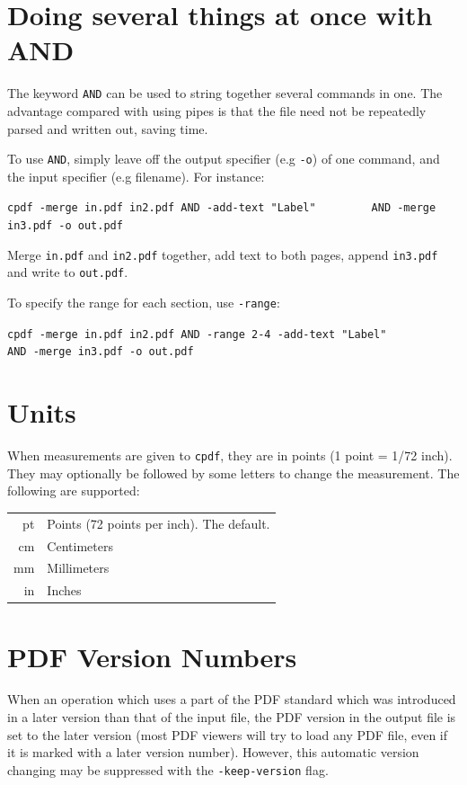 \documentclass[a4paper,makeidx]{memoir}
\newcommand{\cpdf}{\texttt{cpdf}}
\begin{document}
\section{Doing several things at once with AND}

The keyword \texttt{AND} can be used to string together several commands in
one. The advantage compared with using pipes is that the file need not be
repeatedly parsed and written out, saving time.

To use \texttt{AND}, simply leave off the output specifier (e.g \texttt{-o}) of
one command, and the input specifier (e.g filename). For instance:

\begin{framed}
  \small\verb!cpdf -merge in.pdf in2.pdf AND -add-text "Label"!
  \noindent\small\verb!        AND -merge in3.pdf -o out.pdf!

  \vspace{2.5mm}
  \noindent Merge \texttt{in.pdf} and \texttt{in2.pdf} together, add text to both pages, append \texttt{in3.pdf} and write to \texttt{out.pdf}.
\end{framed}

\noindent To specify the range for each section, use \texttt{-range}:

\begin{framed}
  \small\verb!cpdf -merge in.pdf in2.pdf AND -range 2-4 -add-text "Label"!
  \noindent\small\verb!        AND -merge in3.pdf -o out.pdf!

\end{framed}

\section{Units}
When measurements are given to \cpdf, they are in points (1 point = 1/72 inch). They may optionally
be followed by some letters to change the measurement. The following are
supported:

\begin{table}[h]
\centering
\begin{tabular}{rl}
  pt & Points (72 points per inch). The default. \\
  cm & Centimeters \\
  mm & Millimeters \\
  in & Inches \\
\end{tabular}
\end{table}

\section{PDF Version Numbers}
When an operation which uses a part of the PDF standard which was introduced in
a later version than that of the input file, the PDF version in the output file
is set to the later version (most PDF viewers will try to load any PDF file,
even if it is marked with a later version number). However, this automatic
version changing may be suppressed with the \texttt{-keep-version} flag.
\end{document}
